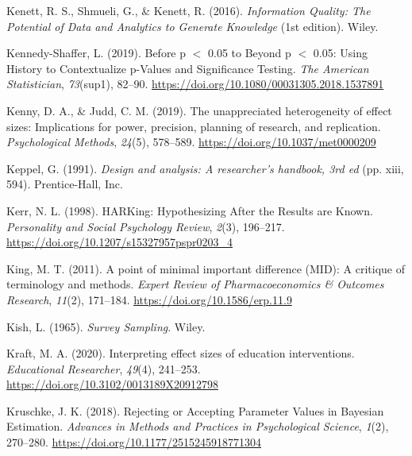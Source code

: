 \documentclass[
  oneside]{krantz}
\newlength{\cslhangindent}
\newlength{\cslentryspacingunit} %
\newenvironment{CSLReferences}[2] %
 {%
  \setlength{\parindent}{0pt}
  \ifodd #1
  \let\oldpar\par
  \def\par{\hangindent=\cslhangindent\oldpar}
  \fi
  \setlength{\parskip}{#2\cslentryspacingunit}
 }%
 {}
\begin{document}
\begin{CSLReferences}{1}{0}
\leavevmode{}%
Kenett, R. S., Shmueli, G., \& Kenett, R. (2016). \emph{Information
{Quality}: {The Potential} of {Data} and {Analytics} to {Generate
Knowledge}} (1st edition). {Wiley}.

\leavevmode{}%
Kennedy-Shaffer, L. (2019). Before p {\(<\)} 0.05 to {Beyond} p {\(<\)}
0.05: {Using History} to {Contextualize} p-{Values} and {Significance
Testing}. \emph{The American Statistician}, \emph{73}(sup1), 82--90.
\url{https://doi.org/10.1080/00031305.2018.1537891}

\leavevmode{}%
Kenny, D. A., \& Judd, C. M. (2019). The unappreciated heterogeneity of
effect sizes: {Implications} for power, precision, planning of research,
and replication. \emph{Psychological Methods}, \emph{24}(5), 578--589.
\url{https://doi.org/10.1037/met0000209}

\leavevmode{}%
Keppel, G. (1991). \emph{Design and analysis: {A} researcher's handbook,
3rd ed} (pp. xiii, 594). {Prentice-Hall, Inc}.

\leavevmode{}%
Kerr, N. L. (1998). {HARKing}: {Hypothesizing After} the {Results} are
{Known}. \emph{Personality and Social Psychology Review}, \emph{2}(3),
196--217. \url{https://doi.org/10.1207/s15327957pspr0203_4}

\leavevmode{}%
King, M. T. (2011). A point of minimal important difference ({MID}): A
critique of terminology and methods. \emph{Expert Review of
Pharmacoeconomics \& Outcomes Research}, \emph{11}(2), 171--184.
\url{https://doi.org/10.1586/erp.11.9}

\leavevmode{}%
Kish, L. (1965). \emph{Survey {Sampling}}. {Wiley}.

\leavevmode{}%
Kraft, M. A. (2020). Interpreting effect sizes of education
interventions. \emph{Educational Researcher}, \emph{49}(4), 241--253.
\url{https://doi.org/10.3102/0013189X20912798}

\leavevmode{}%
Kruschke, J. K. (2018). Rejecting or {Accepting Parameter Values} in
{Bayesian Estimation}. \emph{Advances in Methods and Practices in
Psychological Science}, \emph{1}(2), 270--280.
\url{https://doi.org/10.1177/2515245918771304}


\end{CSLReferences}
\end{document}
